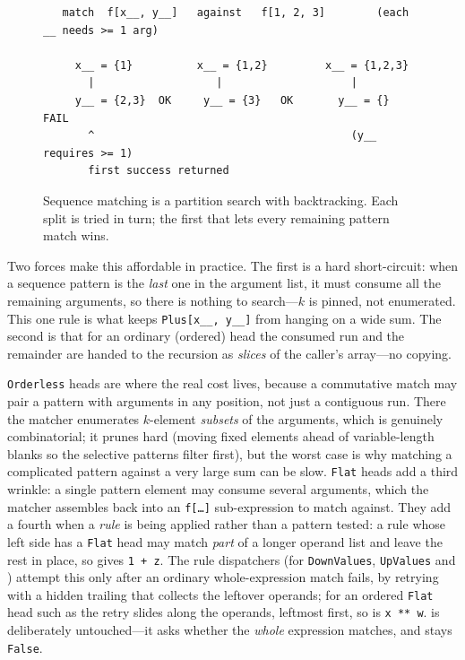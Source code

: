 \begin{figure}[h]
\begin{framed}
\small
\begin{verbatim}
   match  f[x__, y__]   against   f[1, 2, 3]        (each __ needs >= 1 arg)

     x__ = {1}          x__ = {1,2}         x__ = {1,2,3}
       |                   |                    |
     y__ = {2,3}  OK     y__ = {3}   OK       y__ = {}   FAIL
       ^                                        (y__ requires >= 1)
       first success returned
\end{verbatim}
\end{framed}
\caption{Sequence matching is a partition search with backtracking. Each split is
tried in turn; the first that lets every remaining pattern match wins.}
\label{fig:backtrack}
\end{figure}

Two forces make this affordable in practice. The first is a hard short-circuit: when a
sequence pattern is the \emph{last} one in the argument list, it must consume all the
remaining arguments, so there is nothing to search---\(k\) is pinned, not enumerated.
This one rule is what keeps \texttt{Plus[x\_\_, y\_\_]} from hanging on a wide sum. The
second is that for an ordinary (ordered) head the consumed run and the remainder are
handed to the recursion as \emph{slices} of the caller's array---no copying.

\texttt{Orderless} heads are where the real cost lives, because a commutative match may
pair a pattern with arguments in any position, not just a contiguous run. There the
matcher enumerates \(k\)-element \emph{subsets} of the arguments, which is genuinely
combinatorial; it prunes hard (moving fixed elements ahead of variable-length blanks
so the selective patterns filter first), but the worst case is why matching a
complicated pattern against a very large sum can be slow. \texttt{Flat} heads add a
third wrinkle: a single pattern element may consume several arguments, which the
matcher assembles back into an \texttt{f[\dots]} sub-expression to match against.
They add a fourth when a \emph{rule} is being applied rather than a pattern tested: a
rule whose left side has a \texttt{Flat} head may match \emph{part} of a longer
operand list and leave the rest in place, so  gives
\texttt{1 + z}. The rule dispatchers (for
\texttt{DownValues}, \texttt{UpValues} and ) attempt this only after
an ordinary whole-expression match fails, by retrying with a hidden trailing
\mcode{\_\_\_} that collects the leftover operands; for an ordered \texttt{Flat} head
such as  the retry slides along the operands, leftmost
first, so  is \texttt{x ** w}.  is
deliberately untouched---it asks whether the \emph{whole} expression matches, and
 stays \texttt{False}.

